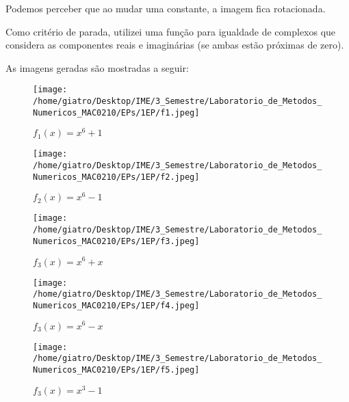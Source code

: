 \documentclass[12pt, a4paper, oneside]{article}
\begin{document}
Podemos perceber que ao mudar uma constante, a imagem fica rotacionada.

Como critério de parada, utilizei uma função para igualdade de complexos
que considera as componentes reais e imaginárias (se ambas estão próximas
de zero).

As imagens geradas são mostradas a seguir:

\begin{figure}
    \texttt{[image: /home/giatro/Desktop/IME/3\_Semestre/Laboratorio\_de\_Metodos\_Numericos\_MAC0210/EPs/1EP/f1.jpeg]}
    \caption{$f_1(x)=x^6+1$}
\end{figure}

\begin{figure}
    \texttt{[image: /home/giatro/Desktop/IME/3\_Semestre/Laboratorio\_de\_Metodos\_Numericos\_MAC0210/EPs/1EP/f2.jpeg]}
    \caption{$f_2(x)=x^6-1$}
\end{figure}

\begin{figure}
    \texttt{[image: /home/giatro/Desktop/IME/3\_Semestre/Laboratorio\_de\_Metodos\_Numericos\_MAC0210/EPs/1EP/f3.jpeg]}
    \caption{$f_3(x)=x^6+x$}
\end{figure}

\begin{figure}
    \texttt{[image: /home/giatro/Desktop/IME/3\_Semestre/Laboratorio\_de\_Metodos\_Numericos\_MAC0210/EPs/1EP/f4.jpeg]}
    \caption{$f_3(x)=x^6-x$}
\end{figure}

\begin{figure}
    \texttt{[image: /home/giatro/Desktop/IME/3\_Semestre/Laboratorio\_de\_Metodos\_Numericos\_MAC0210/EPs/1EP/f5.jpeg]}
    \caption{$f_3(x)=x^3-1$}
\end{figure}
\end{document}
